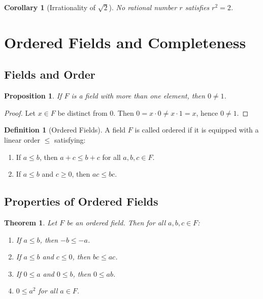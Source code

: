 \documentclass[9pt]{article}
\theoremstyle{definition}
\newtheorem{definition}{Definition}
\theoremstyle{plain}
\newtheorem{theorem}{Theorem}
\newtheorem{proposition}{Proposition}
\newtheorem{corollary}{Corollary}
\begin{document}
\begin{corollary}[Irrationality of $ \sqrt{2} $]
No rational number $ r $ satisfies $ r^2 = 2 $.
\end{corollary}
\section*{Ordered Fields and Completeness}

\subsection*{Fields and Order}
\begin{proposition}
If $ F $ is a field with more than one element, then $ 0 \neq 1 $.
\end{proposition}
\begin{proof}
Let $ x \in F $ be distinct from $ 0 $. Then $ 0 = x \cdot 0 \neq x \cdot 1 = x $, hence $ 0 \neq 1 $.
\end{proof}

\begin{definition}[Ordered Fields]
A field $ F $ is called ordered if it is equipped with a linear order $ \leq $ satisfying:
\begin{enumerate}[label=(O\arabic*)]
    \item If $ a \leq b $, then $ a + c \leq b + c $ for all $ a, b, c \in F $.
    \item If $ a \leq b $ and $ c \geq 0 $, then $ ac \leq bc $.
\end{enumerate}
\end{definition}

\subsection*{Properties of Ordered Fields}
\begin{theorem}
Let $ F $ be an ordered field. Then for all $ a, b, c \in F $:
\begin{enumerate}[label=(\roman*)]
    \item If $ a \leq b $, then $ -b \leq -a $.
    \item If $ a \leq b $ and $ c \leq 0 $, then $ bc \leq ac $.
    \item If $ 0 \leq a $ and $ 0 \leq b $, then $ 0 \leq ab $.
    \item $ 0 \leq a^2 $ for all $ a \in F $.
\end{enumerate}
\end{theorem}
\end{document}
